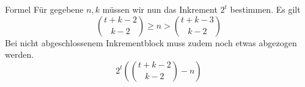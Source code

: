 \begin{frame}{Formel}
    Für gegebene $n,k$ müssen wir nun das Inkrement $2^t$ bestimmen.
    Es gilt \[\binom{t+k-2}{k-2}\geq n>\binom{t+k-3}{k-2}\]
    Bei nicht abgeschlossenem Inkrementblock muss zudem noch etwas abgezogen werden.
    \[2^t\left(\binom{t+k-2}{k-2}-n\right)\]
\end{frame}